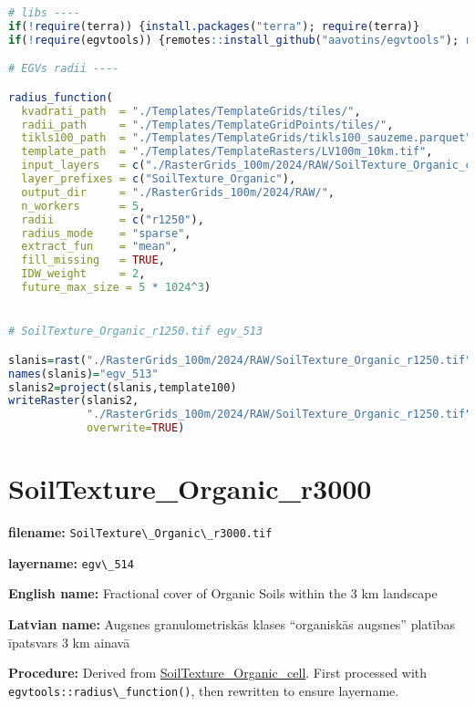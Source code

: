 \documentclass[
]{book}
\newcommand{\passthrough}[1]{#1}
\begin{document}
\begin{lstlisting}[language=R]
# libs ----
if(!require(terra)) {install.packages("terra"); require(terra)}
if(!require(egvtools)) {remotes::install_github("aavotins/egvtools"); require(egvtools)}

# EGVs radii ----

radius_function(
  kvadrati_path  = "./Templates/TemplateGrids/tiles/",
  radii_path     = "./Templates/TemplateGridPoints/tiles/",
  tikls100_path  = "./Templates/TemplateGrids/tikls100_sauzeme.parquet",
  template_path  = "./Templates/TemplateRasters/LV100m_10km.tif",
  input_layers   = c("./RasterGrids_100m/2024/RAW/SoilTexture_Organic_cell.tif"),
  layer_prefixes = c("SoilTexture_Organic"),
  output_dir     = "./RasterGrids_100m/2024/RAW/",
  n_workers      = 5,
  radii          = c("r1250"),
  radius_mode    = "sparse",
  extract_fun    = "mean",
  fill_missing   = TRUE,
  IDW_weight     = 2,
  future_max_size = 5 * 1024^3)


# SoilTexture_Organic_r1250.tif egv_513

slanis=rast("./RasterGrids_100m/2024/RAW/SoilTexture_Organic_r1250.tif")
names(slanis)="egv_513"
slanis2=project(slanis,template100)
writeRaster(slanis2,
            "./RasterGrids_100m/2024/RAW/SoilTexture_Organic_r1250.tif",
            overwrite=TRUE)
\end{lstlisting}

\section{SoilTexture\_Organic\_r3000}\label{ch06.514}

\textbf{filename:} \passthrough{\lstinline!SoilTexture\_Organic\_r3000.tif!}

\textbf{layername:} \passthrough{\lstinline!egv\_514!}

\textbf{English name:} Fractional cover of Organic Soils within the 3 km landscape

\textbf{Latvian name:} Augsnes granulometriskās klases ``organiskās augsnes'' platības īpatsvars 3 km ainavā

\textbf{Procedure:} Derived from \hyperref[ch06.511]{SoilTexture\_Organic\_cell}. First processed
with \passthrough{\lstinline!egvtools::radius\_function()!}, then rewritten to ensure layername.
\end{document}
